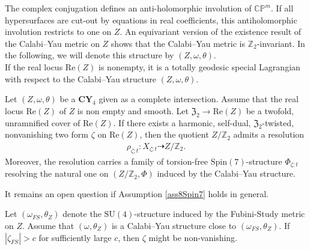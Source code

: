 \documentclass[psamsfonts]{amsart}
\theoremstyle{plain}
\theoremstyle{definition}{
\newtheorem{defi}{Definition}[section]
\newtheorem{ass}{Assumption}
\newtheorem*{nota}{Notation}}
\theoremstyle{remark}{
\newtheorem{rem}{Remark}
\newtheorem{ex}{Example}}
\theoremstyle{plain}{
\newtheorem{thm}{Theorem}[section]
\newtheorem{lem}{Lemma}[section]
\newtheorem{cor}{Corollary}[section]
\newtheorem{prop}{Proposition}[section]
\newtheorem{con}{Conjecture}[section]}
\newcommand{\m}[1]{{\mathrm{#1}}}
\newcommand{\cat}[1]{\textbf{#1}}
\begin{document}
The complex conjugation defines an anti-holomorphic involution of $\mathbb{CP}^m$. If all hypersurfaces are cut-out by equations in real coefficients, this antiholomorphic involution restricts to one on $Z$. An equivariant version of the existence result of the Calabi--Yau metric on $Z$ shows that the Calabi--Yau metric is $\mathbb{Z}_2$-invariant. In the following, we will denote this structure by $(Z,\omega,\theta)$.\\

If the real locus $\m{Re}(Z)$ is nonempty, it is a totally geodesic special Lagrangian with respect to the Calabi--Yau structure $(Z,\omega,\theta)$.

\begin{prop}
Let $(Z,\omega,\theta)$ be a $\cat{CY}_4$ given as a complete intersection. Assume that the real locus $\m{Re}(Z)$ of $Z$ is non empty and smooth. Let $\mathfrak{Z}_2\rightarrow \m{Re}(Z)$ be a twofold, unramnified cover of $\m{Re}(Z)$. If there exists a harmonic, self-dual, $\mathfrak{Z}_2$-twisted, nonvanishing two form $\zeta$ on $\m{Re}(Z)$, then the quotient $Z/\mathbb{Z}_2$ admits a resolution 
\begin{align*}
    \rho_{\zeta;t}\colon X_{\zeta;t}\dashrightarrow Z/\mathbb{Z}_2.
\end{align*}
Moreover, the resolution carries a family of torsion-free $\m{Spin}(7)$-structure $\Phi_{\zeta;t}$ resolving the natural one on $(Z/\mathbb{Z}_2,\Phi)$ induced by the Calabi--Yau structure.
\end{prop}

\begin{rem}
It remains an open question if Assumption \ref{ass8Spin7} holds in general.
\end{rem}

    \begin{rem}
        Let $(\omega_{FS},\theta_Z)$ denote the $\m{SU}(4)$-structure induced by the Fubini-Study metric on $Z$. Assume that $(\omega,\theta_Z)$ is a Calabi--Yau structure close to $(\omega_{FS},\theta_Z)$. If $|\zeta_{FS}|>c$ for sufficiently large $c$, then $\zeta$ might be non-vanishing.
    \end{rem}
\end{document}
